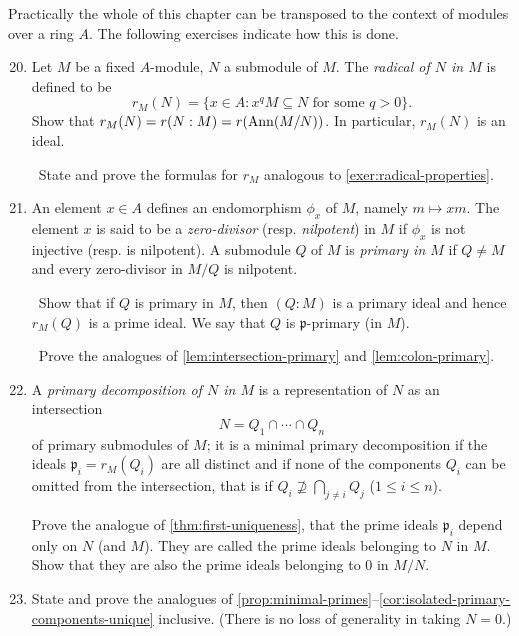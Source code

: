 Practically the whole of this chapter can be transposed to the context of modules over a ring $A$. The following exercises indicate how this is done.
\begin{enumerate}
    \setcounter{enumi}{19}
    \item \label{exer20-chapter4}Let $M$ be a fixed $A$-module, $N$ a submodule of $M$. The \emph{radical of $N$ in $M$} is defined to be
    \[
    r_M(N) = \{x \in A : x^q M \subseteq N \text{ for some } q > 0\}.
    \]
    Show that $r_M(N) = r(N : M) = r(\operatorname{Ann}(M/N))$. In particular, $r_M(N)$ is an ideal.
    
    \quad\, State and prove the formulas for $r_M$ analogous to \eqref{exer:radical-properties}.

    \item \label{exer21-chapter4}An element $x \in A$ defines an endomorphism $\phi_x$ of $M$, namely $m \mapsto xm$. The element $x$ is said to be a \emph{zero-divisor} (resp. \emph{nilpotent}) in $M$ if $\phi_x$ is not injective (resp. is nilpotent). A submodule $Q$ of $M$ is \emph{primary in $M$} if $Q \neq M$ and every zero-divisor in $M/Q$ is nilpotent.
    
    \quad\, Show that if $Q$ is primary in $M$, then $(Q : M)$ is a primary ideal and hence $r_M(Q)$ is a prime ideal. We say that $Q$ is $\mathfrak{p}$-primary (in $M$).

    \quad\, Prove the analogues of \eqref{lem:intersection-primary} and \eqref{lem:colon-primary}.

    \item \label{exer22-chapter4}A \emph{primary decomposition of $N$ in $M$} is a representation of $N$ as an intersection
    \[
    N = Q_1 \cap \cdots \cap Q_n
    \]
    of primary submodules of $M$; it is a minimal primary decomposition if the ideals $\mathfrak{p}_i = r_M(Q_i)$ are all distinct and if none of the components $Q_i$ can be omitted from the intersection, that is if $Q_i \not\supseteq \bigcap_{j \neq i} Q_j$ ($1 \leq i \leq n$).

    Prove the analogue of \eqref{thm:first-uniqueness}, that the prime ideals $\mathfrak{p}_i$ depend only on $N$ (and $M$). They are called the prime ideals belonging to $N$ in $M$. Show that they are also the prime ideals belonging to $0$ in $M/N$.

    \item \label{exer23-chapter4}State and prove the analogues of \eqref{prop:minimal-primes}--\eqref{cor:isolated-primary-components-unique} inclusive. (There is no loss of generality in taking $N = 0$.)
\end{enumerate}
